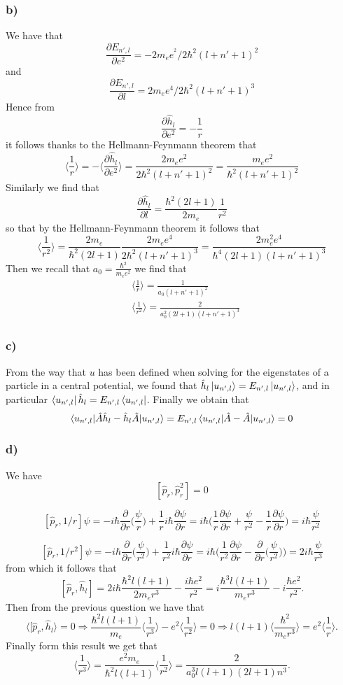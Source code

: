 \documentclass[10pt,a4paper]{book}
\newcommand{\p}{\partial}
\begin{document}
\subsubsection*{b)}
We have that
$$\frac{\p E_{n',l}}{\p e^2}=-2m_ee^{^2}/2\hbar^2(l+n'+1)^2$$
and 
$$\frac{\p E_{n',l}}{\p l}=2m_ee^4/2\hbar^2(l+n'+1)^3$$
Hence from
$$\frac{\p \hat{h}_l}{\p e^2}=-\frac{1}{r}
$$
it follows thanks to the Hellmann-Feynmann theorem that 
$$\bigg\langle \frac{1}{r}\bigg\rangle =-\bigg\langle \frac{\p \hat{h}_l}{\p e^2}\bigg\rangle =\frac{2m_ee^2}{2\hbar^2(l+n'+1)^2}=\frac{m_ee^2}{\hbar^2(l+n'+1)^2}$$ Similarly we find that 
$$\frac{\p\hat{h}_l}{\p l}=\frac{\hbar^2(2l+1)}{2m_e}\frac{1}{r^2}$$
so that by the Hellmann-Feynmann theorem it follows that 
$$\bigg\langle \frac{1}{r^2}\bigg\rangle = \frac{2m_e}{\hbar^2(2l+1)}\frac{2m_ee^4}{2\hbar^2(l+n'+1)^3}=\frac{2m_e^2e^4}{\hbar^4(2l+1)(l+n'+1)^3}$$
Then we recall that $a_0=\frac{\hbar^2}{m_ee^2}$ we find that
\begin{align*}
&\bigg\langle\frac{1}{r}\bigg\rangle
=\frac{1}{a_0(l+n'+1)^2}\\
&\bigg\langle \frac{1}{r^2}\bigg\rangle =\frac{2}{a_0^2(2l+1)(l+n'+1)^3}
\end{align*}

\subsubsection*{c)}
From the way that $u$ has been defined when solving for the eigenstates of a particle in a central potential, we found that $\hat{h}_l	\ket{u_{n',l}}=E_{n',l}\ket{u_{n',l}}$, and in particular $\bra{u_{n',l}}\hat{h}_l=E_{n',l}\bra{u_{n',l}}$. Finally we obtain that 
$$\braket{u_{n',l}|\hat{A}\hat{h}_l-\hat{h}_l\hat{A}|u_{n',l}}=E_{n',l}\braket{u_{n',l}|\hat{A}-\hat{A}|u_{n',l}}=0$$

\subsubsection*{d)}
We have
$$[\hat{p}_r,\hat{p}_r^2]=0
$$

$$[\hat{p}_r,1/r]\psi=-i\hbar \frac{\p}{\p r}\bigg(\frac{\psi}{r}\bigg)+\frac{1}{r}i\hbar\frac{\p \psi}{\p r}=i\hbar\bigg(\frac{1}{r}\frac{\p\psi}{\p r}+\frac{\psi}{r^2}-\frac{1}{r}\frac{\p\psi}{\p r}\bigg)=i\hbar\frac{\psi}{r^2}$$

$$[\hat{p}_r,1/r^2]\psi=-i\hbar \frac{\p}{\p r}\bigg(\frac{\psi}{r^2}\bigg)+\frac{1}{r^2}i\hbar\frac{\p \psi}{\p r}=i\hbar\bigg(\frac{1}{r^2}\frac{\p\psi}{\p r}-\frac{\p}{\p r}\bigg(\frac{\psi}{r^2}\bigg)\bigg)=2i\hbar\frac{\psi}{r^3}$$
from which it follows that 
$$[\hat{p}_r,\hat{h}_l]=2i\hbar\frac{\hbar^2l(l+1)}{2m_er^3}-\frac{i\hbar e^2}{r^2}=i\frac{\hbar^3l(l+1)}{m_er^3}-i\frac{\hbar e^2}{r^2}.$$
Then from the previous question we have that 
$$\langle [\hat{p}_r,\hat{h}_l\rangle=0\Rightarrow\frac{\hbar^2l(l+1)}{m_e}\bigg\langle\frac{1}{r^3}\bigg\rangle-e^2\bigg\langle\frac{1}{r^2}\bigg\rangle=0\Rightarrow l(l+1)\bigg\langle \frac{\hbar^2}{m_er^3}\bigg\rangle=e^2\bigg\langle\frac{1}{r}\bigg\rangle.$$
Finally form this result we get that 
$$\bigg\langle\frac{1}{r^3}\bigg\rangle =\frac{e^2m_e}{\hbar^2l(l+1)}\bigg\langle\frac{1}{r^2}\bigg\rangle=\frac{2}{a_0^3l(l+1)(2l+1)n^3}.$$
\end{document}
